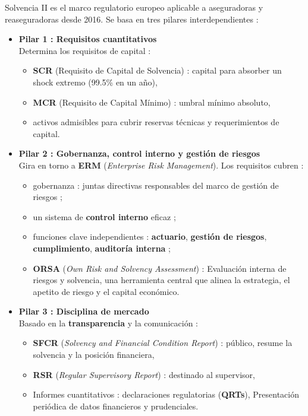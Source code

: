 	
\begin{f}
	
	Solvencia II es el marco regulatorio europeo aplicable a aseguradoras y reaseguradoras desde 2016. Se basa en tres pilares interdependientes :
	
	\begin{itemize}
		\item \textbf{Pilar 1 : Requisitos cuantitativos} \\
		Determina los requisitos de capital :
		\begin{itemize}
			\item \textbf{SCR} (Requisito de Capital de Solvencia) : capital para absorber un shock extremo (99.5\% en un año),
			\item \textbf{MCR} (Requisito de Capital Mínimo) : umbral mínimo absoluto,
			\item activos admisibles para cubrir reservas técnicas y requerimientos de capital.
		\end{itemize}
		
		\item \textbf{Pilar 2 : Gobernanza, control interno y gestión de riesgos} \\
		Gira en torno a \textbf{ERM} (\emph{Enterprise Risk Management}). Los requisitos cubren :
		\begin{itemize}
			\item gobernanza : juntas directivas responsables del marco de gestión de riesgos ;
			\item un sistema de \textbf{control interno} eficaz ;
			\item funciones clave independientes : \textbf{actuario}, \textbf{gestión de riesgos}, \textbf{cumplimiento}, \textbf{auditoría interna} ;
			\item \textbf{ORSA} (\emph{Own Risk and Solvency Assessment}) : Evaluación interna de riesgos y solvencia, una herramienta central que alinea la estrategia, el apetito de riesgo y el capital económico.
		\end{itemize}
		
		\item \textbf{Pilar 3 : Disciplina de mercado} \\
		Basado en la \textbf{transparencia} y la comunicación :
		\begin{itemize}
			\item \textbf{SFCR} (\emph{Solvency and Financial Condition Report}) : público, resume la solvencia y la posición financiera,
			\item \textbf{RSR} (\emph{Regular Supervisory Report}) : destinado al supervisor,
			\item Informes cuantitativos : declaraciones regulatorias (\textbf{QRTs}), Presentación periódica de datos financieros y prudenciales.
		\end{itemize}
	\end{itemize}
		
\end{f}
